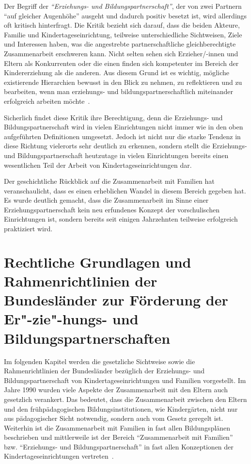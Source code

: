 \documentclass[12pt,a4paper]{article}
\begin{document}
	Der Begriff der \textit{"`Erziehungs- und Bildungspartnerschaft"'}, der von zwei Partnern "`auf gleicher Augenhöhe"' ausgeht und dadurch positiv besetzt ist, wird allerdings oft kritisch hinterfragt. Die Kritik bezieht sich darauf, dass die beiden Akteure, Familie und Kindertageseinrichtung, teilweise unterschiedliche Sichtweisen, Ziele und Interessen haben, was die angestrebte partnerschaftliche gleichberechtigte Zusammenarbeit erschweren kann. Nicht selten sehen sich Erzieher/-innen und Eltern als Konkurrenten oder die einen finden sich kompetenter im Bereich der Kindererziehung als die anderen. Aus diesem Grund ist es wichtig, mögliche existierende Hierarchien bewusst in den Blick zu nehmen, zu reflektieren und zu bearbeiten, wenn man erziehungs- und bildungspartnerschaftlich miteinander erfolgreich arbeiten möchte~\parencite[S.~186]{Entwpsych}.
	
Sicherlich findet diese Kritik ihre Berechtigung, denn die Erziehungs- und Bildungspartnerschaft wird in vielen Einrichtungen nicht immer wie in den oben aufgeführten Definitionen umgesetzt. Jedoch ist nicht nur die starke Tendenz in diese Richtung vielerorts sehr deutlich zu erkennen, sondern stellt die Erziehungs- und Bildungspartnerschaft heutzutage in vielen Einrichtungen bereits einen wesentlichen Teil der Arbeit von Kindertageseinrichtungen dar.

	Der geschichtliche Rückblick auf die Zusammenarbeit mit Familien hat veranschaulicht, dass es einen erheblichen Wandel in diesem Bereich gegeben hat. Es wurde deutlich gemacht, dass die Zusammenarbeit im Sinne einer Erziehungspartnerschaft kein neu erfundenes Konzept der vorschulischen Einrichtungen ist, sondern bereits seit einigen Jahrzehnten teilweise erfolgreich praktiziert wird.
	
\section{Rechtliche Grundlagen und Rahmenrichtlinien der Bundesländer zur Förderung der Er"-zie"-hungs- und Bildungspartnerschaften}
\label{recht}
Im folgenden Kapitel werden die gesetzliche Sichtweise sowie die Rahmenrichtlinien der Bundesländer bezüglich der Erziehungs- und Bildungspartnerschaft von Kindertageseinrichtungen und Familien vorgestellt.
Im Jahre 1990 wurden viele Aspekte der Zusammenarbeit mit den Eltern auch gesetzlich verankert. Das bedeutet, dass die Zusammenarbeit zwischen den Eltern und den frühpädagogischen Bildungsinstitutionen, wie Kindergärten, nicht nur aus pädagogischer Sicht notwendig, sondern auch vom Gesetz geregelt ist. Weiterhin ist die Zusammenarbeit mit Familien in fast allen Bildungsplänen beschrieben und mittlerweile ist der Bereich "`Zusammenarbeit mit Familien"' bzw. "`Erziehungs- und Bildungspartnerschaft"' in fast allen Konzeptionen der Kindertageseinrichtungen vertreten~\parencite[S.~80]{Thiersch_2006}.
\end{document}
